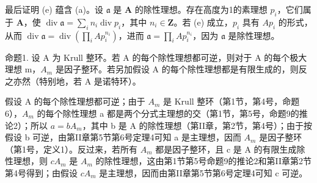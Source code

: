 最后证明 (e) 蕴含 (a)。设 \(\mathfrak{a}\) 是 \(\mathbf{A}\) 的除性理想。存在高度为1的素理想 \(p_i\)，它们属于 \(\mathbf{A}\)，使 \(\operatorname{div} \mathfrak{a} = \sum_{i} n_i \operatorname{div} p_i\)，其中 \(n_i \in \mathbf{Z}\)。若 (e) 成立，\(p_i\) 具有 \(A p_i\) 的形式，从而 \(\operatorname{div} \mathfrak{a} = \operatorname{div}\left(\prod_{i} A p_i^{n_i}\right)\)，进而 \(\mathfrak{a} = \prod_{i} A p_i^{n_i}\)，因为 \(\mathfrak{a}\) 是除性理想。

命题1. 设 A 为 Krull 整环。若 A 的每个除性理想都可逆，则对于 A 的每个极大理想 m，\(A_{m}\) 是因子整环。若另加假设 A 的每个除性理想都是有限生成的，则反之亦然（特别地，若 A 是诺特环）。

假设 A 的每个除性理想都可逆；由于 \(A_{m}\) 是 Krull 整环（第1节，第4号，命题6），\(A_{m}\) 的每个除性理想 a 都是两个分式主理想的交（第1节，第5号，命题9的推论2）；所以 \(a = bA_{m}\)，其中 b 是 A 的除性理想（第II章，第2节，第4号）；由于按假设 b 可逆，由第II章第5节第6号定理4可知 a 是主理想，因而 \(A_{m}\) 是因子整环（第1号，定义1）。反过来，若所有 \(A_{m}\) 都是因子整环，且 c 是 A 的有限生成除性理想，则 \(cA_{m}\) 是 \(A_{m}\) 的除性理想，这由第1节第5号命题9的推论2和第II章第2节第4号得到；由假设 \(cA_{m}\) 是主理想，因而由第II章第5节第6号定理4可知 c 可逆。

